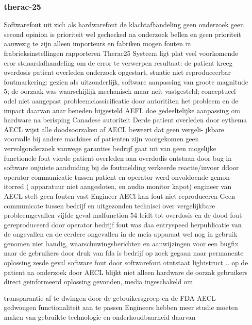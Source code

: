 \subsubsection{therac-25}
Softwarefout uit zich als hardwarefout de klachtafhandeling geen onderzoek geen second opinion is prioriteit wel 
gechecked na onderzoek bellen en geen prioriteit aanwezig te zijn alleen importeurs en fabriken mogen fouten 
in frabrieksinstellingen rapporteren 
Therac25 Systeem ligt plat veel voorkomende eror stdaardafhandeling om de error te verwerpen resultaat: 
de patient kreeg overdosis patient overleden onderzoek opgestart, stuatie niet reproduceerbar foutmarkering: 
gezien als uitzonderlijk, software aanpassing van groote magnitude 5; de oorzaak was waarschijlijk mechanisch 
maar neit vastgesteld; conceptueel odel niet aangepast probleemclassicificatie door autorititen het probleem 
en de impact daarvan anar beneden bijgesteld AEFL doe gedeeltelijke aanpassing om hardware na berisping 
Canadese autoriteit 
Derde patient overleden door eythema AECL wijst alle doodsoorzaken af AECL beweert dat geen vergeli- 
jkbare voorvalle bij andere machines of patienten zijn voorgekomen geen vervolgonderzoek vanwege garanties 
bedrijf gaat uit van geen mogelijke functionele fout 
vierde patient overleden aan overdodis ontstaan door bug in software onjuiste aanduiding bij de foutmelding 
verkeerde reactie/invoer ddoor operator communicatie tussen patient en operator werd onvoldoende gemon- 
itorred ( apparatuur niet aangesloten, en audio monitor kapot) engineer van AECL stelt geen fouten vast 
Engineer AECl kan fout niet reproduceren Geen communicate tussen bedrijf en uitgezonden technisci over 
vergelijkbare probleemgevallen 
vijfde geval malfunction 54 leidt tot overdosis en de dood fout gereproduceerd door operator bedrijf fout 
was daa entryspeed herpublicatie van de ongevallen en de eerdere ongevallen in de meia apparaat wel nog in 
gebruik genomen niet handig, waarschuwingsberichten en aanwijzingen voor een bugfix naar de gebruikers door 
druk van fda is bedrijf op zoek gegaan naar permanente oplossing 
zesde geval software fout door softwarefout otntstaat lightstruct .. op de patient na onderzoek door AECL 
blijkt niet alleen hardware de oorzak gebruikers direct geinformeerd oplossing gevonden, media ingeschakeld om 

transparantie af te dwingen door de gebruikersgroep en de FDA AECL gedwongen functionaliteit aan te passen 
Engineers hebben meer studie moeten maken van gebruikte technologie en onderhoudbaarheid daarvan 


